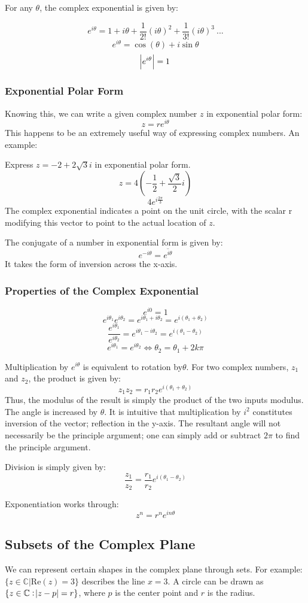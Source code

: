 \documentclass[12pt]{report}
\begin{document}
\begin{flushleft}
For any \(\theta\), the complex exponential is given by:

\[e^{i\theta} = 1 + i\theta + \frac{1}{2!}(i\theta)^2 + \frac{1}{3!}(i\theta)^3 \: ...\]
\[e^{i\theta} = \cos(\theta) + i\sin\theta\]
\[\abs{e^{i\theta}} = 1\]

\subsubsection*{Exponential Polar Form}

Knowing this, we can write a given complex number \(z\) in exponential polar form:
\[z = re^{i\theta}\]
This happens to be an extremely useful way of expressing complex numbers. An example:

\bigskip
Express \(z = -2 + 2\sqrt{3}i\) in exponential polar form.
\[z = 4(-\frac{1}{2} + \frac{\sqrt{3}}{2}i)\]
\[4e^{i\frac{2\pi}{3}}\]
The complex exponential indicates a point on the unit circle, with the scalar r
modifying this vector to point to the actual location of \(z\).

\bigskip
The conjugate of a number in exponential form is given by:
\[e^{-i\theta} = \overline{e^{i\theta}}\]
It takes the form of inversion across the x-axis.

\subsubsection*{Properties of the Complex Exponential}
\[e^{i0} = 1\]
\[e^{i\theta_1}e^{i\theta_2} = e^{i\theta_1+i\theta_2} = e^{i(\theta_1+\theta_2)}\]
\[\frac{e^{i\theta_1}}{e^{i\theta_2}} = e^{i\theta_1 - i\theta_2} = e^{i(\theta_1-\theta_2)}\]
\[e^{i\theta_1} = e^{i\theta_2} \Leftrightarrow \theta_2 = \theta_1 + 2k\pi\]

Multiplication by \(e^{i\theta}\) is equivalent to rotation by\(\theta\). For two complex
numbers, \(z_1\) and \(z_2\), the product is given by:
\[z_1z_2 = r_1r_2e^{i(\theta_1+\theta_2)}\]
Thus, the modulus of the result is simply the product of the two inputs modulus. The
angle is increased by \(\theta\). It is intuitive that multiplication by \(i^2\) constitutes
inversion of the vector; reflection in the y-axis. The resultant angle will not necessarily be
the principle argument; one can simply add or subtract \(2\pi\) to find the principle argument.

\bigskip
Division is simply given by:
\[\frac{z_1}{z_2} = \frac{r_1}{r_2}e^{i(\theta_1-\theta_2)}\]

Exponentiation works through:
\[z^n = r^ne^{in\theta}\]

\subsection*{Subsets of the Complex Plane}
We can represent certain shapes in the complex plane through sets. For example:
\(\{z \in \mathbb{C} | \mathrm{Re}(z) = 3\}\) describes the line \(x = 3\). A
circle can be drawn as \(\{z \in \mathbb{C}:  \abs{z - p} = r\}\), where \(p\) is
the center point and \(r\) is the radius.

\end{flushleft}
\end{document}
